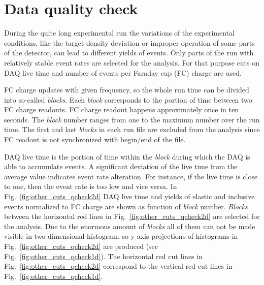 \section{Data quality check}
\label{qcheck}

During the quite long experimental run the variations of the experimental conditions, like the target density deviation or improper operation of some parts of the detector, can lead to different yields of events. Only parts of the run with relatively stable event rates are selected for the analysis.
For that purpose cuts on DAQ live time and number of events per Faraday cup (FC) charge are used. 

FC charge updates with given frequency, so the whole run time can be divided into so-called {\em blocks}. Each {\em block} corresponds to the portion of time between two FC charge readouts. FC charge readout happens approximately once in ten seconds. The {\em block} number ranges from one to the maximum number over the run time. The first and last {\em blocks} in each run file are excluded from the analysis since FC readout is not synchronized with begin/end of the file.

DAQ live time is the portion of time within the {\em block} during which the DAQ is able to accumulate events. A significant deviation of the live time from the average value indicates event rate alteration. For instance, if the live time is close to one, then the event rate is too low and vice versa.
In Fig.~\ref{fig:other_cuts_qcheck2d}  DAQ live time and  yields of elastic and inclusive events normalized to FC charge are shown as function of {\em block} number. {\em Blocks} between the horizontal red lines in Fig.~\ref{fig:other_cuts_qcheck2d} are selected for the analysis.
Due to the enormous amount of {\em blocks} all of them can not be made visible in two dimensional histogram, so y-axis projections of histograms in Fig.~\ref{fig:other_cuts_qcheck2d} are produced (see Fig.~\ref{fig:other_cuts_qcheck1d}). The horizontal red cut lines in Fig.~\ref{fig:other_cuts_qcheck2d} correspond to the vertical red cut lines in Fig.~\ref{fig:other_cuts_qcheck1d}.




